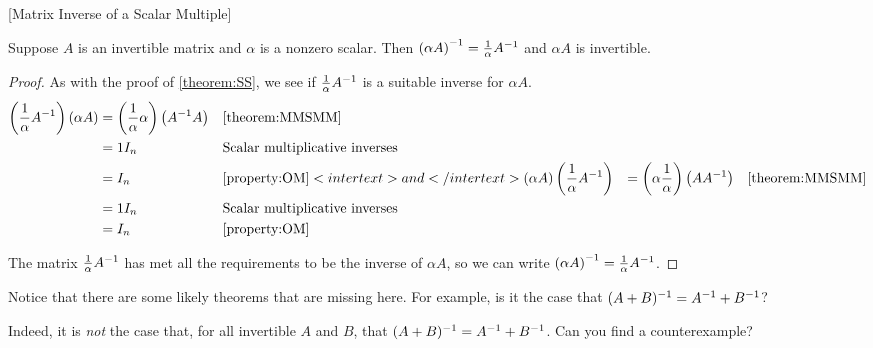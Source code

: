 \documentclass{ximera}
\begin{document}
\begin{theorem}
  \label{theorem:MISM}
  [Matrix Inverse of a Scalar Multiple]

  Suppose $A$ is an invertible matrix and $\alpha$ is a nonzero
  scalar.  Then
  $\left(\alpha A\right)^{-1}=\frac{1}{\alpha}A^{-1}$ and
  $\alpha A$ is invertible.

  \begin{proof}
    As with the proof of \ref{theorem:SS}, we see if $\frac{1}{\alpha}A^{-1}$ is a suitable inverse for $\alpha A$.
    \begin{align*}
      \left(\frac{1}{\alpha}A^{-1}\right)\left(\alpha A\right)
      &=\left(\frac{1}{\alpha}\alpha\right)\left(A^{-1}A\right)&&\ref{theorem:MMSMM}\\
      &=1I_n&&\text{Scalar multiplicative inverses}\\
      &=I_n&&\ref{property:OM}
              <intertext>and</intertext>
              \left(\alpha A\right)\left(\frac{1}{\alpha}A^{-1}\right)&=
                                                                             \left(\alpha\frac{1}{\alpha}\right)\left(AA^{-1}\right)&&\ref{theorem:MMSMM}\\
      &=1I_n&&\text{Scalar multiplicative inverses}\\
      &=I_n&&\ref{property:OM}
    \end{align*}

    The matrix $\frac{1}{\alpha}A^{-1}$ has met all the
    requirements to be the inverse of $\alpha A$, so we can write
    $\left(\alpha A\right)^{-1}=\frac{1}{\alpha}A^{-1}$.

  \end{proof}
\end{theorem}

\begin{question}
  Notice that there are some likely theorems that are missing here.  For
  example, is it the case that
  $(A+B)^{-1}=A^{-1}+B^{-1}$?
  \begin{multipleChoice}
  \end{multipleChoice}

  \begin{feedback}[correct]
    Indeed, it is \textit{not} the case that, for all invertible $A$
    and $B$, that $(A+B)^{-1}=A^{-1}+B^{-1}$.  Can you
    find a counterexample?
  \end{feedback}

\end{question}
\end{document}
